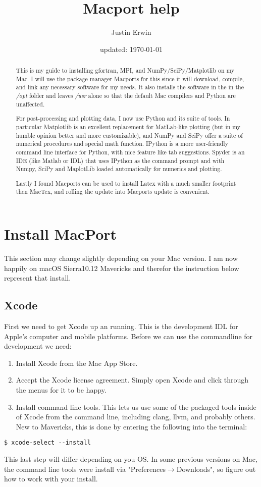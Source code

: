 \documentclass[11pt, A4paper]{article}
\title{Macport help}
\author{Justin Erwin}
\date{updated: \today}
\begin{document}
\maketitle

\begin{abstract}
This is my guide to installing gfortran, MPI,  and NumPy/SciPy/Matplotlib on my Mac. I will use the package manager Macports for this since it will download, compile, and link any necessary software for my needs. It also installs the software in the in the \textit{/opt} folder and leaves \textit{/usr} alone so that the default Mac compilers and Python are unaffected.

For post-processing and plotting data, I now use Python and its suite of tools.  In particular Matplotlib is an excellent replacement for MatLab-like plotting (but in my humble opinion better and more customizable), and NumPy and SciPy offer a suite of numerical procedures and special math function. IPython is a more user-friendly command line interface for Python, with nice feature like tab suggestions. Spyder is an IDE (like Matlab or IDL) that uses IPython as the command prompt and with Numpy, SciPy and MaplotLib loaded automatically for numerics and plotting.

Lastly I found Macports can be used to install Latex with a much smaller footprint then MacTex, and rolling the update into Macports update is convenient. 
\end{abstract}


%
%
%
\tableofcontents


%
%
%
\section{Install MacPort}
This section may change slightly depending on your Mac version. I am now happily on macOS Sierra10.12 Mavericks and therefor the instruction below represent that install. 
\subsection{Xcode}
First we need to get Xcode up an running. This is the development IDL for Apple's computer and mobile platforms. Before we can use the commandline for development we need:
\begin{enumerate}
	\item Install Xcode from the Mac App Store.
	\item Accept the Xcode license agreement. Simply open Xcode and click through the menus for it to be happy.
	\item Install command line tools. This lets us use some of the packaged tools inside of Xcode from the command line, including clang, llvm, and probably others. New to Mavericks, this is done by entering the following into the terminal:
\end{enumerate}
\begin{lstlisting}[style=Bash]
$ xcode-select --install
\end{lstlisting}
This last step will differ depending on you OS. In some previous versions on Mac, the command line tools were install via "Preferences$\rightarrow$Downloads", so figure out how to work with your install.
\end{document}
